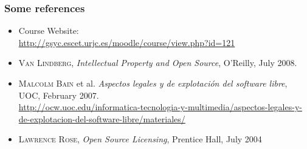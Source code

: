 

\begin{frame}
\frametitle{Some references}

\begin{itemize}
\item Course Website: \\
  {\footnotesize \url{http://gsyc.escet.urjc.es/moodle/course/view.php?id=121}}
\item \textsc{Van Lindberg}, \textit{Intellectual Property and Open Source}, O'Reilly, July 2008.
\item \textsc{Malcolm Bain} et al. \textit{Aspectos legales y de explotación del software libre}, UOC, February 2007. \\
{\footnotesize \url{http://ocw.uoc.edu/informatica-tecnologia-y-multimedia/aspectos-legales-y-de-explotacion-del-software-libre/materiales/}}
\item \textsc{Lawrence Rose}, \textit{Open Source Licensing}, Prentice Hall, July 2004 
\end{itemize}

\end{frame}



